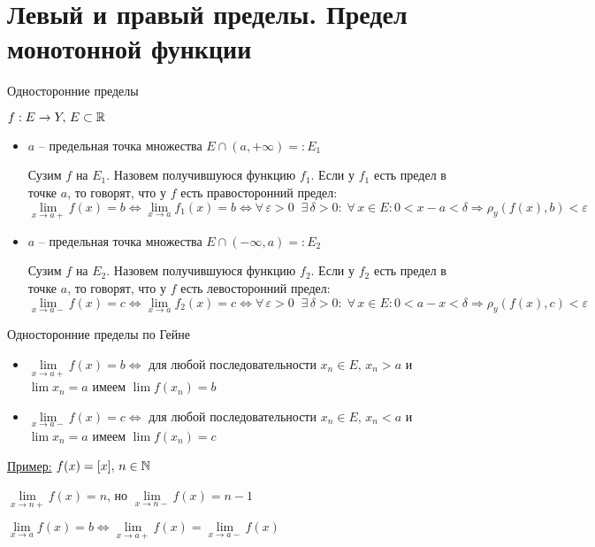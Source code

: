 \section{Левый и правый пределы. Предел монотонной функции \href{https://youtu.be/BiTNBigkkyU?t=6035}{\Walley}}
\begin{conj}
    Односторонние пределы
\end{conj}
$f : E \to Y, \, E \subset \mathbb{R}$
\begin{itemize}
    \item $a$ -- предельная точка множества $E \cap (a, +\infty) =: E_1$
    
    Сузим $f$ на $E_1$. Назовем получившуюся функцию $f_1$. 
    Если у $f_1$ есть предел в точке $a$, то говорят, что у $f$ есть правосторонний предел:
    \[ \lim_{x \to a+} f(x) = b \Longleftrightarrow \lim_{x \to a} f_1(x) = b \Longleftrightarrow 
    \forall \, \varepsilon > 0 \;\; \exists \, \delta > 0 : \; \forall \, x \in E : 0 < x - a < \delta \Rightarrow\rho_y(f(x), b) < \varepsilon \]
    
    \item $a$ -- предельная точка множества $E \cap (-\infty, a) =: E_2$
    
    Сузим $f$ на $E_2$. Назовем получившуюся функцию $f_2$.
    Если у $f_2$ есть предел в точке $a$, то говорят, что у $f$ есть левосторонний предел:
    \[ \lim_{x \to a-} f(x) = c \Longleftrightarrow \lim_{x \to a} f_2(x) = c \Longleftrightarrow 
    \forall \, \varepsilon > 0 \;\; \exists \, \delta > 0 : \; \forall \, x \in E : 0 < a - x < \delta \Rightarrow\rho_y(f(x), c) < \varepsilon \]
\end{itemize}
\begin{conj}
    Односторонние пределы по Гейне
\end{conj}
\begin{itemize}
    \item $\lim\limits_{x \to a+} f(x) = b \Longleftrightarrow$ для любой последовательности $x_n \in E, \, x_n > a$ и $\lim x_n = a$ имеем $\lim f(x_n) = b$
    \item $\lim\limits_{x \to a-} f(x) = c \Longleftrightarrow$ для любой последовательности $x_n \in E, \, x_n < a$ и $\lim x_n = a$ имеем $\lim f(x_n) = c$
\end{itemize}
\underline{Пример:} $f(x) = [x], \, n \in \mathbb{N}$

$\lim\limits_{x \to n+} f(x) = n$, но $\lim\limits_{x \to n-} f(x) = n - 1$

\begin{notice}
    $\lim\limits_{x \to a} f(x) = b \Longleftrightarrow \lim\limits_{x \to a+} f(x) = \lim\limits_{x \to a-} f(x)$
\end{notice}

